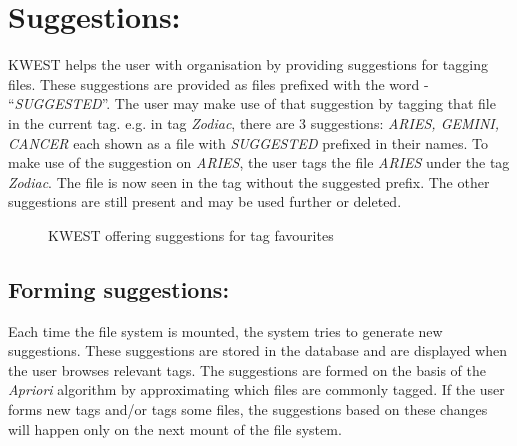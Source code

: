 \section{Suggestions:}
KWEST helps the user with organisation by providing suggestions for tagging files. These suggestions are provided as files prefixed with the word - ``\textit{SUGGESTED}''. The user may make use of that suggestion by tagging that file in the current tag. \newline
e.g. in tag \textit{Zodiac}, there are 3 suggestions: \textit{ARIES, GEMINI, CANCER} each shown as a file with \textit{SUGGESTED} prefixed in their names. To make use of the suggestion on \textit{ARIES}, the user tags the file \textit{ARIES} under the tag \textit{Zodiac}. The file is now seen in the tag without the suggested prefix. The other suggestions are still present and may be used further or deleted.
\begin{figure}[htb]
\centering
\setlength\fboxsep{0pt}
\setlength\fboxrule{0.5pt}
\caption{KWEST offering suggestions for tag favourites}
\label{fig:dfd0}
\end{figure}

\subsection*{Forming suggestions:}
Each time the file system is mounted, the system tries to generate new suggestions. These suggestions are stored in the database and are displayed when the user browses relevant tags. The suggestions are formed on the basis of the \textit{Apriori} algorithm by approximating which files are commonly tagged. If the user forms new tags and/or tags some files, the suggestions based on these changes will happen only on the next mount of the file system.

